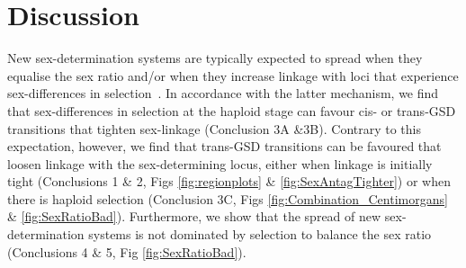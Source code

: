 \documentclass[10pt,letterpaper]{article}
\providecommand{\DIFdelend}{} %
\begin{document}
\DIFdelend %
\section*{Discussion}

New sex-determination systems are typically expected to spread when they equalise the sex ratio and/or when they increase linkage with loci that experience sex-differences in selection~\cite{Blaser2012, vanDoorn2014re}.
In accordance with the latter mechanism, we find that sex-differences in selection at the haploid stage can favour cis- or trans-GSD transitions that tighten sex-linkage (Conclusion 3A \&3B). 
Contrary to this expectation, however, we find that trans-GSD transitions can be favoured that loosen linkage with the sex-determining locus, either when linkage is initially tight (Conclusions 1 \& 2, Figs \ref{fig:regionplots} \& \ref{fig:SexAntagTighter}) or when there is haploid selection (Conclusion 3C, Figs \ref{fig:Combination_Centimorgans} \& \ref{fig:SexRatioBad}). 
Furthermore, we show that the spread of new sex-determination systems is not dominated by selection to balance the sex ratio (Conclusions 4 \& 5, Fig \ref{fig:SexRatioBad}). 
\end{document}
